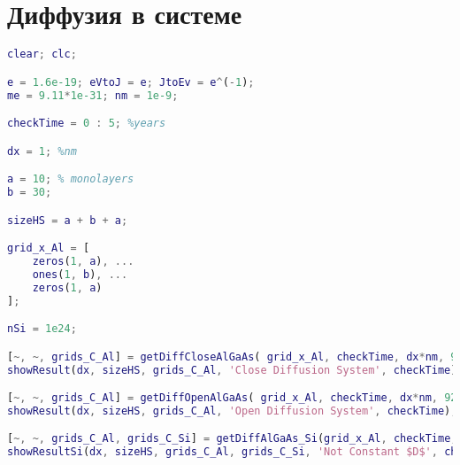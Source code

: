 \chapter{Диффузия в системе}
\label{app:Diff}
\begin{lstlisting}[style=realcode,language=Matlab,caption={Функция расчета диффузионного размытия атомов $Al$ в <<открытой>> и в <<закрытой>> системе $i$-$Al_{x}Ga_{1-x}As$},label={lst:mainDiff}]
clear; clc;

e = 1.6e-19; eVtoJ = e; JtoEv = e^(-1); 
me = 9.11*1e-31; nm = 1e-9;

checkTime = 0 : 5; %years

dx = 1; %nm

a = 10; % monolayers
b = 30; 

sizeHS = a + b + a;

grid_x_Al = [
	zeros(1, a), ...
	ones(1, b), ...
	zeros(1, a)
];

nSi = 1e24;

[~, ~, grids_C_Al] = getDiffCloseAlGaAs( grid_x_Al, checkTime, dx*nm, 920 );
showResult(dx, sizeHS, grids_C_Al, 'Close Diffusion System', checkTime); %img 2.5

[~, ~, grids_C_Al] = getDiffOpenAlGaAs( grid_x_Al, checkTime, dx*nm, 920 );
showResult(dx, sizeHS, grids_C_Al, 'Open Diffusion System', checkTime); %img 2.7

[~, ~, grids_C_Al, grids_C_Si] = getDiffAlGaAs_Si(grid_x_Al, checkTime, dx*nm, 430, nSi);
showResultSi(dx, sizeHS, grids_C_Al, grids_C_Si, 'Not Constant $D$', checkTime); %img 2.9
\end{lstlisting}